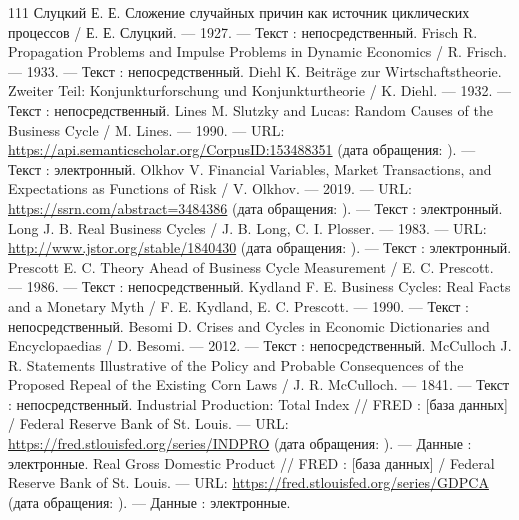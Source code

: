 \begin{RaggedRight}
\begin{thebibliography}{111}
     \hypertarget{bib:Слуцкий-1927}{} Слуцкий Е. Е. Сложение случайных причин как источник циклических процессов / Е. Е. Слуцкий. --- 1927. --- Текст : непосредственный.
     \hypertarget{bib:Frisch-1933}{} Frisch R. Propagation Problems and Impulse Problems in Dynamic Economics / R. Frisch. --- 1933. --- Текст : непосредственный.
     \hypertarget{bib:Diehl-1932}{} Diehl K. Beiträge zur Wirtschaftstheorie. Zweiter Teil: Konjunkturforschung und Konjunkturtheorie / K. Diehl. --- 1932. --- Текст : непосредственный.
     \hypertarget{bib:Lines-1990}{} Lines M. Slutzky and Lucas: Random Causes of the Business Cycle / M. Lines. --- 1990. --- URL: \url{https://api.semanticscholar.org/CorpusID:153488351} (дата обращения: \bibaccessdate). --- Текст : электронный.
     \hypertarget{bib:Olkhov-2019}{} Olkhov V. Financial Variables, Market Transactions, and Expectations as Functions of Risk / V. Olkhov. --- 2019. --- URL: \url{https://ssrn.com/abstract=3484386} (дата обращения: \bibaccessdate). --- Текст : электронный.
     \hypertarget{bib:Long-1983}{} Long J. B. Real Business Cycles / J. B. Long, C. I. Plosser. --- 1983. --- URL: \url{http://www.jstor.org/stable/1840430} (дата обращения: \bibaccessdate). --- Текст : электронный.
     \hypertarget{bib:Prescott-1986}{} Prescott E. C. Theory Ahead of Business Cycle Measurement / E. C. Prescott. --- 1986. --- Текст : непосредственный.
     \hypertarget{bib:Kydland-1990}{} Kydland F. E. Business Cycles: Real Facts and a Monetary Myth / F. E. Kydland, E. C. Prescott. --- 1990. --- Текст : непосредственный.
     \hypertarget{bib:Besomi-2012}{} Besomi D. Crises and Cycles in Economic Dictionaries and Encyclopaedias / D. Besomi. --- 2012. --- Текст : непосредственный.
     \hypertarget{bib:McCulloch-1841}{} McCulloch J. R. Statements Illustrative of the Policy and Probable Consequences of the Proposed Repeal of the Existing Corn Laws / J. R. McCulloch. --- 1841. --- Текст : непосредственный.
     \hypertarget{bib:FRED-INDPRO}{} Industrial Production: Total Index // FRED : [база данных] / Federal Reserve Bank of St. Louis. --- URL: \url{https://fred.stlouisfed.org/series/INDPRO} (дата обращения: \bibaccessdate). --- Данные : электронные.
     \hypertarget{bib:FRED-GDPCA}{} Real Gross Domestic Product // FRED : [база данных] / Federal Reserve Bank of St. Louis. --- URL: \url{https://fred.stlouisfed.org/series/GDPCA} (дата обращения: \bibaccessdate). --- Данные : электронные.

\end{thebibliography}
\end{RaggedRight}
